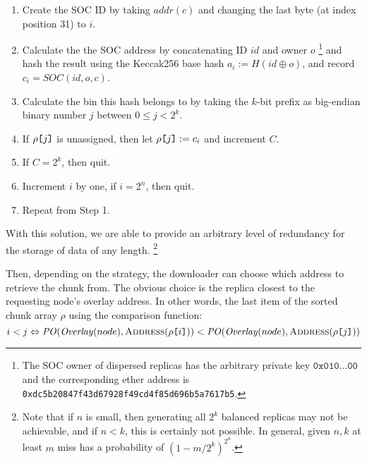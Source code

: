 \documentclass[a4paper,11pt]{article}
\newcommand{\idx}[1]{\texttt{[}\/#1\/\texttt{]}}
\DeclareMathOperator{\concat}{\operatorname{\oplus}}
\begin{document}
\begin{enumerate}[noitemsep]
  \item Create the SOC ID by taking $\mathit{addr}(c)$ and changing the last byte (at index position 31) to  $i$.
  \item Calculate the the SOC address by concatenating ID $id$ and owner $o$%
%
\footnote{The SOC owner of dispersed replicas has the arbitrary private key $\texttt{0x010...00}$
and the corresponding ether address is 
\texttt{0xdc5b20847f43d67928f49cd4f85d696b5a7617b5}.}
%
and hash the result using the Keccak256 base hash $a_i:=H(id\concat o)$, and record $c_i=\mathit{SOC}(id,o,c)$.
  \item Calculate the bin this hash belongs to by taking the $k$-bit prefix as big-endian binary number $j$ between $0\leq j<2^k$.
  \item If $\rho\idx{j}$ is unassigned, then let $\rho\idx{j}:=c_i$ and increment $C$.
  \item If $C=2^k$, then quit.
  \item Increment $i$ by one, if $i=2^n$, then quit.
  \item Repeat from Step 1.
\end{enumerate}

With this solution, we are able to provide an arbitrary level of redundancy for the storage of data of any length.
%
%
\footnote{Note that if $n$ is small, then generating all $2^k$ balanced replicas may not be achievable, and if $n<k$, this is certainly not possible.
In general, given $n, k$ at least $m$ miss has a probability of $(1 - m/2^k)^{2^n}$.}

Then, depending on the strategy, the downloader can choose which  address to retrieve the chunk from. The obvious choice is the replica closest to the requesting node's overlay address. In other words, the last item of the sorted chunk array $\rho$ using the comparison function:
\begin{equation}
  i<j\Leftrightarrow    	
  \mathit{PO}(    \mathit{Overlay}(node),
  \textsc{Address}(\rho\idx{i}))
  <\mathit{PO}(\mathit{Overlay}(node),
  \textsc{Address}(\rho\idx{j}))
\end{equation}


\end{document}
